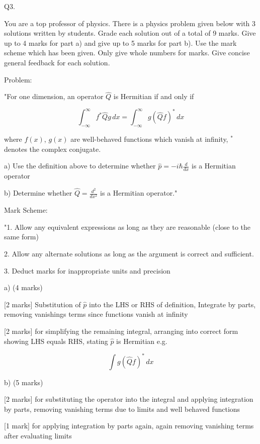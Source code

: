                            Q3. 

You are a top professor of physics. There is a physics problem given below with 3 solutions written by students. Grade each solution out of a total of 9 marks. Give up to 4 marks for part a) and give up to 5 marks for part b). Use the mark scheme which has been given. Only give whole numbers for marks. Give concise general feedback for each solution. 

Problem: 

"For one dimension, an operator \( \hat{Q} \) is Hermitian if and only if 

\[ \int_{-\infty}^{\infty} f^{*}\hat{Q}g \, dx = \int_{-\infty}^{\infty} g(\hat{Q}f)^{*} \, dx \]

where \( f(x) \), \( g(x) \) are well-behaved functions which vanish at infinity, \( ^{*} \) denotes the complex conjugate. 

a) Use the definition above to determine whether \( \hat{p} = -i\hbar\frac{d}{dx} \) is a Hermitian operator 

b) Determine whether \( \hat{Q} = \frac{d^{2}}{dx^{2}} \) is a Hermitian operator."

Mark Scheme:

"1. Allow any equivalent expressions as long as they are reasonable (close to the same form)

2. Allow any alternate solutions as long as the argument is correct and sufficient. 

3. Deduct marks for inappropriate units and precision

a) (4 marks)

[2 marks] Substitution of \( \hat{p} \) into the LHS or RHS of definition, Integrate by parts, removing vanishings terms since functions vanish at infinity 

[2 marks] for simplifying the remaining integral, arranging into correct form showing LHS equals RHS, stating  \( \hat{p} \) is Hermitian e.g. 

\[ \int g (\hat{Q}f)^{*} \, dx \]

b) (5 marks)

[2 marks] for substituting the operator into the integral and applying integration by parts, removing vanishing terms due to limits and well behaved functions

[1 mark] for applying integration by parts again, again removing vanishing terms after evaluating limits

